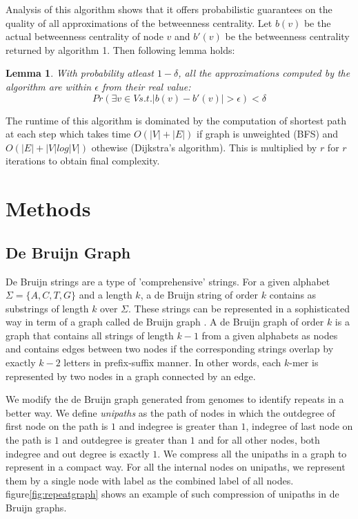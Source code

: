 \documentclass[runningheads,a4paper]{llncs}
\newtheorem{mylemma}{Lemma}
\begin{document}
Analysis of this algorithm shows that it offers probabilistic guarantees on the quality of all approximations of the betweenness centrality. Let $b(v)$ be the actual betweenness centrality of node $v$ and $b'(v)$ be the betweenness centrality returned by algorithm 1. Then following lemma holds:

\begin{mylemma}
With probability atleast $1-\delta$, all the approximations computed by the algorithm are within $\epsilon$ from their real value:
$$Pr(\exists v \in V s.t. |b(v) - b'(v)| > \epsilon) < \delta$$
\end{mylemma}

The runtime of this algorithm is dominated by the computation of shortest path at each step which takes time $O(|V| + |E|)$ if graph is unweighted (BFS) and $O(|E| + |V|log|V|)$ othewise (Dijkstra's algorithm). This is multiplied by $r$ for $r$ iterations to obtain final complexity.


\section{Methods}

\subsection*{De Bruijn Graph} 

De Bruijn strings are a type of 'comprehensive' strings. For a given alphabet $\Sigma = \{A,C,T,G\}$ and a length $k$, a de Bruijn string of order $k$ contains as substrings of length $k$ over $\Sigma$. These strings can be represented in a sophisticated way in term of a graph called de Bruijn graph \cite{debruijn}. A de Bruijn graph of order $k$ is a graph that contains all strings of length $k-1$ from a given alphabets as nodes and contains edges between two nodes if the corresponding strings overlap by exactly $k-2$ letters in prefix-suffix manner. In other words, each $k$-mer is represented by two nodes in a graph connected by an edge. 

We modify the de Bruijn graph generated from genomes to identify repeats in a better way. We define \textit{unipaths} as the path of nodes in which the outdegree of first node on the path is $1$ and indegree is greater than $1$, indegree of last node on the path is $1$ and outdegree is greater than $1$ and for all other nodes, both indegree and out degree is exactly $1$. We compress all the unipaths in a graph to represent in a compact way. For all the internal nodes on unipaths, we represent them by a single node with label as the combined label of all nodes. figure\ref{fig:repeatgraph} shows an example of such compression of unipaths in de Bruijn graphs. 
\end{document}
